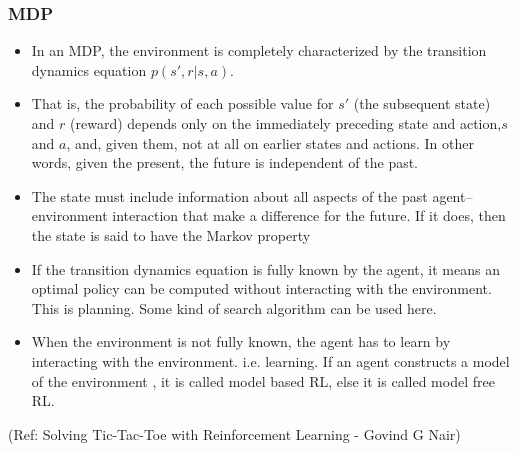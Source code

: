 



\begin{frame}[fragile]\frametitle{MDP}


\begin{itemize}
\item In an MDP, the environment is completely characterized by the transition dynamics equation $p(s',r|s,a)$.
\item That is, the probability of each possible value for $s'$ (the subsequent state) and $r$ (reward) depends only on the immediately preceding state and action,$s$ and $a$, and, given them, not at all on earlier states and actions. In other words, given the present, the future is independent of the past.
\item The state must include information about all aspects of the past agent–environment interaction that make a difference for the future. If it does, then the state is said to have the Markov property
\item If the transition dynamics equation is fully known by the agent, it means an optimal policy can be computed without interacting with the environment. This is planning. Some kind of search algorithm can be used here.
\item When the environment is not fully known, the agent has to learn by interacting with the environment. i.e. learning. If an agent constructs a model of the environment , it is called model based RL, else it is called model free RL.
\end{itemize}



{\tiny (Ref: Solving Tic-Tac-Toe with Reinforcement Learning - Govind G Nair)}

\end{frame}





